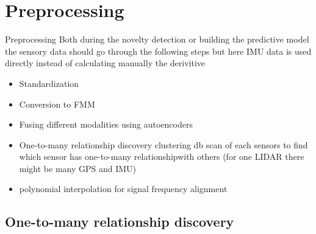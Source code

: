 \section{Preprocessing}
    \begin{frame}[allowframebreaks]{Preprocessing}
        Both during the novelty detection or building the predictive model the sensory data should go through the following steps but here IMU data is used directly instead of calculating manually the derivitive
        \begin{itemize}
            \item Standardization
            \item Conversion to FMM
            \item Fusing different modalities using autoencoders
            \item One-to-many relationship discovery clustering db scan of each sensors to find which sensor has one-to-many relationshipwith others (for one LIDAR there might be many GPS and IMU)
            \item polynomial interpolation for signal frequency alignment
        \end{itemize}
    
    \end{frame}
    
    \subsection{One-to-many relationship discovery}
        
        